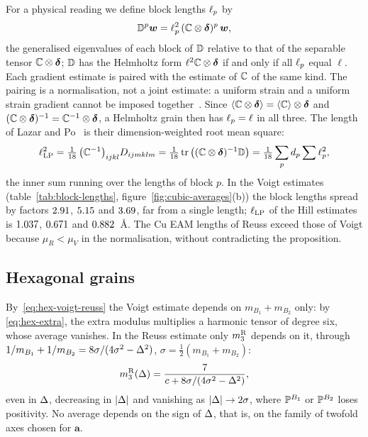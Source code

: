 For a physical reading we define block lengths $\ell_{p}$ by
\begin{equation}
\mathbb{D}^p\bm w=\ell_{p}^2\,(\mathbb{C}\otimes\bm{\delta})^p\,\bm w,\label{eq:block-lengths}
\end{equation}
the generalised eigenvalues of each block of $\mathbb{D}$ relative to that of the separable tensor
$\mathbb{C}\otimes\bm{\delta}$; $\mathbb{D}$ has the Helmholtz form $\ell^2\mathbb{C}\otimes\bm{\delta}$ if and only if all
$\ell_{p}$ equal $\ell$. Each gradient estimate is paired with the estimate of $\mathbb{C}$ of the
same kind. The pairing is a normalisation, not a joint estimate: a uniform strain and a
uniform strain gradient cannot be imposed together~\cite[remark~1]{Lazar2022}. Since $\langle \mathbb{C}\otimes\bm{\delta}\rangle=\langle \mathbb{C}\rangle\otimes\bm{\delta}$ and
$(\mathbb{C}\otimes\bm{\delta})^{-1}=\mathbb{C}^{-1}\otimes\bm{\delta}$, a Helmholtz grain then has
$\ell_{p}=\ell$ in all three. The length of Lazar and Po~\cite[eq.~(107)]{Lazar2024} is
their dimension-weighted root mean square:
\begin{equation}
\ell_{\mathrm{LP}}^2=\tfrac1{18}\,\big(\mathbb{C}^{-1}\big)_{ijkl}D_{ijmklm}
=\tfrac1{18}\operatorname{tr}\big((\mathbb{C}\otimes\bm{\delta})^{-1}\mathbb{D}\big)=\tfrac1{18}\sum_pd_{p}\sum\ell_{p}^2,
\label{eq:lazar-po-length}
\end{equation}
the inner sum running over the lengths of block $p$. In the Voigt estimates
(table~\ref{tab:block-lengths}, figure~\ref{fig:cubic-averages}(b)) the block lengths
spread by factors $2.91$, $5.15$ and
$3.69$, far from a single length; $\ell_{\mathrm{LP}}$ of the Hill estimates is
$1.037$, $0.671$ and $0.882$~\AA. The Cu EAM
lengths of Reuss exceed those of Voigt because $\mu_R<\mu_V$ in the normalisation, without
contradicting the proposition.

\subsection{Hexagonal grains}\label{sec:averages-hexagonal}

By~\eqref{eq:hex-voigt-reuss} the Voigt estimate depends on $m_{B_1}+m_{B_2}$ only: by
\eqref{eq:hex-extra}, the extra modulus multiplies a harmonic tensor of degree six, whose
average vanishes. In the Reuss estimate only $m_3^{\mathrm{R}}$ depends on it, through
$1/m_{B_1}+1/m_{B_2}=8\sigma/(4\sigma^2-\Delta^2)$, $\sigma=\tfrac12(m_{B_1}+m_{B_2})$:
\begin{equation}
m_3^{\mathrm{R}}(\Delta)=\frac{7}{c+8\sigma/(4\sigma^2-\Delta^2)},\label{eq:hex-reuss-delta}
\end{equation}
even in $\Delta$, decreasing in $|\Delta|$ and vanishing as $|\Delta|\to2\sigma$, where
$\mathbb{P}^{B_1}$ or $\mathbb{P}^{B_2}$ loses positivity. No average depends on the sign of $\Delta$,
that is, on the family of twofold axes chosen for $\bm a$.

